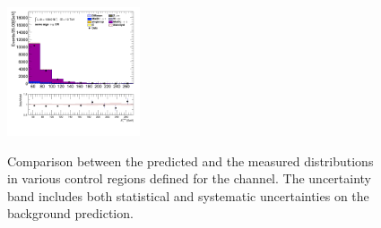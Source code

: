 \begin{figure}[!htp]
\begin{center}
			\includegraphics[width=0.35\textwidth]{chapters/chapter6_HPlus/images/taulep/met_et_SS_TAUMU.png} \\
			\end{center}
			\caption{
			Comparison between the predicted and the measured \Etm distributions in various control regions defined for the \taulep channel. The uncertainty band includes both statistical and systematic uncertainties on the background prediction. 
			}
			\label{fig:bkg-met-taulep}
		\end{figure}

